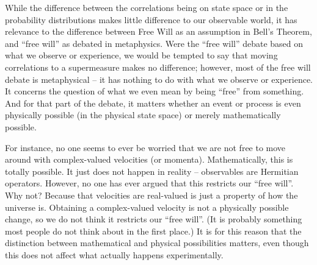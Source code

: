 \documentclass[12pt]{article}
\begin{document}

While the difference between the correlations being on state space or in the probability distributions makes little difference to our observable world, it has relevance to the difference between Free Will as an assumption in Bell's Theorem, and ``free will'' as debated in metaphysics. Were the ``free will'' debate based on what we observe or experience, we would be tempted to say that moving correlations to a supermeasure makes no difference; however, most of the free will debate is metaphysical -- it has nothing to do with what we observe or experience. It concerns the question of what we even mean by being ``free'' from something. And for that part of the debate, it matters whether an event or process is even physically possible (in the physical state space) or merely mathematically possible. 

For instance, no one seems to ever be worried that we are not free to move around with complex-valued velocities (or momenta). Mathematically, this is totally possible. It just does not happen in reality -- observables are Hermitian operators. However, no one has ever argued that this restricts our ``free will''. Why not? Because that velocities are real-valued is just a property of how the universe is. Obtaining a complex-valued velocity is not a physically possible change, so we do not think it restricts our ``free will''. (It is probably something most people do not think about in the first place.) It is for this reason that the distinction between mathematical and physical possibilities matters, even though this does not affect what actually happens experimentally.
\end{document}

